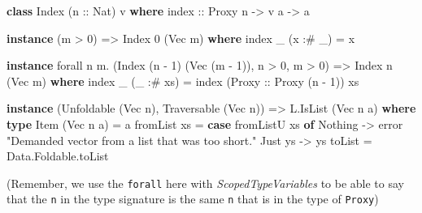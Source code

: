 \documentclass[]{article}
\newenvironment{Shaded}{\begin{snugshade}}{\end{snugshade}}
\newcommand{\DataTypeTok}[1]{\textcolor[rgb]{0.13,0.29,0.53}{#1}}
\newcommand{\DecValTok}[1]{\textcolor[rgb]{0.00,0.00,0.81}{#1}}
\newcommand{\FunctionTok}[1]{\textcolor[rgb]{0.00,0.00,0.00}{#1}}
\newcommand{\KeywordTok}[1]{\textcolor[rgb]{0.13,0.29,0.53}{\textbf{#1}}}
\newcommand{\NormalTok}[1]{#1}
\newcommand{\OtherTok}[1]{\textcolor[rgb]{0.56,0.35,0.01}{#1}}
\newcommand{\StringTok}[1]{\textcolor[rgb]{0.31,0.60,0.02}{#1}}
\begin{document}
\begin{Shaded}
\begin{Highlighting}[]
\KeywordTok{class} \DataTypeTok{Index}\NormalTok{ (}\OtherTok{n ::} \DataTypeTok{Nat}\NormalTok{) v }\KeywordTok{where}
\OtherTok{    index ::} \DataTypeTok{Proxy}\NormalTok{ n }\OtherTok{->}\NormalTok{ v a }\OtherTok{->}\NormalTok{ a}

\KeywordTok{instance}\NormalTok{ (m }\FunctionTok{>} \DecValTok{0}\NormalTok{) }\OtherTok{=>} \DataTypeTok{Index} \DecValTok{0}\NormalTok{ (}\DataTypeTok{Vec}\NormalTok{ m) }\KeywordTok{where}
\NormalTok{    index _ (x }\FunctionTok{:#}\NormalTok{ _) }\FunctionTok{=}\NormalTok{ x}

\KeywordTok{instance}\NormalTok{ forall n m}\FunctionTok{.}\NormalTok{ (}\DataTypeTok{Index}\NormalTok{ (n }\FunctionTok{-} \DecValTok{1}\NormalTok{) (}\DataTypeTok{Vec}\NormalTok{ (m }\FunctionTok{-} \DecValTok{1}\NormalTok{)), n }\FunctionTok{>} \DecValTok{0}\NormalTok{, m }\FunctionTok{>} \DecValTok{0}\NormalTok{) }\OtherTok{=>} \DataTypeTok{Index}\NormalTok{ n (}\DataTypeTok{Vec}\NormalTok{ m) }\KeywordTok{where}
\NormalTok{    index _ (_ }\FunctionTok{:#}\NormalTok{ xs) }\FunctionTok{=}\NormalTok{ index (}\DataTypeTok{Proxy}\OtherTok{ ::} \DataTypeTok{Proxy}\NormalTok{ (n }\FunctionTok{-} \DecValTok{1}\NormalTok{)) xs}

\KeywordTok{instance}\NormalTok{ (}\DataTypeTok{Unfoldable}\NormalTok{ (}\DataTypeTok{Vec}\NormalTok{ n), }\DataTypeTok{Traversable}\NormalTok{ (}\DataTypeTok{Vec}\NormalTok{ n)) }\OtherTok{=>} \DataTypeTok{L.IsList}\NormalTok{ (}\DataTypeTok{Vec}\NormalTok{ n a) }\KeywordTok{where}
    \KeywordTok{type} \DataTypeTok{Item}\NormalTok{ (}\DataTypeTok{Vec}\NormalTok{ n a) }\FunctionTok{=}\NormalTok{ a}
\NormalTok{    fromList xs }\FunctionTok{=} \KeywordTok{case}\NormalTok{ fromListU xs }\KeywordTok{of}
                    \DataTypeTok{Nothing} \OtherTok{->}\NormalTok{ error }\StringTok{"Demanded vector from a list that was too short."}
                    \DataTypeTok{Just}\NormalTok{ ys }\OtherTok{->}\NormalTok{ ys}
\NormalTok{    toList      }\FunctionTok{=}\NormalTok{ Data.Foldable.toList}
\end{Highlighting}
\end{Shaded}

(Remember, we use the \texttt{forall} here with \emph{ScopedTypeVariables} to be
able to say that the \texttt{n} in the type signature is the same \texttt{n}
that is in the type of \texttt{Proxy})
\end{document}
